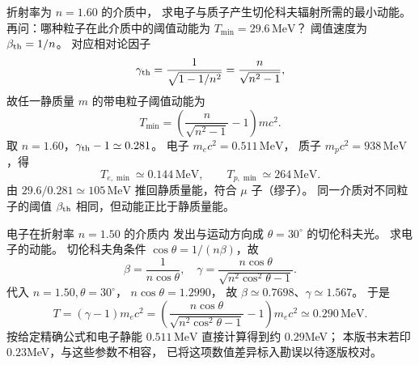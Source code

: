 折射率为 $n=1.60$ 的介质中，
求电子与质子产生切伦科夫辐射所需的最小动能。
再问：哪种粒子在此介质中的阈值动能为
$T_{\min}=29.6\,\mathrm{MeV}$？
\exsolution
阈值速度为
$\beta_{\rm th}=1/n$。
对应相对论因子
\[
 \gamma_{\rm th}
 =\frac1{\sqrt{1-1/n^2}}
 =\frac n{\sqrt{n^2-1}},
\]
故任一静质量 $m$ 的带电粒子阈值动能为
\[
 \boxed{T_{\min}=
 \left(\frac n{\sqrt{n^2-1}}-1\right)mc^2}.
\]
取 $n=1.60$，$\gamma_{\rm th}-1\simeq0.281$。
电子 $m_ec^2=0.511\,\mathrm{MeV}$，
质子 $m_pc^2=938\,\mathrm{MeV}$，得
\[
 \boxed{T_{e,\min}\simeq0.144\,\mathrm{MeV}},\qquad
 \boxed{T_{p,\min}\simeq264\,\mathrm{MeV}}.
\]
由 $29.6/0.281\simeq105\,\mathrm{MeV}$
推回静质量能，符合 $\mu$ 子（缪子）。
\excheck 同一介质对不同粒子的阈值
$\beta_{\rm th}$ 相同，但动能正比于静质量能。

电子在折射率 $n=1.50$ 的介质内
发出与运动方向成 $\theta=30^\circ$
的切伦科夫光。
求电子的动能。
\exsolution
切伦科夫角条件
$\cos\theta=1/(n\beta)$，故
\[
 \boxed{\beta=\frac1{n\cos\theta}},
 \quad
 \boxed{\gamma=
 \frac{n\cos\theta}{\sqrt{n^2\cos^2\theta-1}}}.
\]
代入
$n=1.50,\theta=30^\circ$，
$n\cos\theta=1.2990$，
故 $\beta\simeq0.7698$、$\gamma\simeq1.567$。
于是
\[
 \boxed{T=(\gamma-1)m_ec^2
 =\left(\frac{n\cos\theta}
 {\sqrt{n^2\cos^2\theta-1}}-1\right)
 m_ec^2
 \simeq0.290\,\mathrm{MeV}}.
\]
\excheck 按给定精确公式和电子静能 $0.511\,\mathrm{MeV}$
直接计算得到约 $0.29$MeV；
本版书末若印 $0.23$MeV，与这些参数不相容，
已将这项数值差异标入勘误以待逐版校对。
